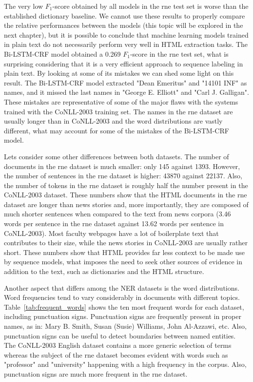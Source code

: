 \documentclass{nle}
\begin{document}
The very low $ F_1 $-score obtained by all models in the \gls{rne} test set is worse than the established
dictionary baseline. We cannot use these results to properly compare the relative performances 
between the models (this topic will be explored in the next chapter), but it is possible to conclude
that machine learning models trained in plain text do not necessarily perform very well in HTML 
extraction tasks. The Bi-LSTM-CRF model obtained a 0.269 $ F_1 $-score in the \gls{rne} test
set, what is surprising considering that it is a very efficient approach to sequence labeling in plain 
text. By looking at some of its mistakes we can shed some light on this result. The Bi-LSTM-CRF model
extracted "Dean Emeritus" and "14101 INF" as names, and it missed the last names in "George E. Elliott"
and "Carl J. Galligan". These mistakes are representative of some of the major flaws with the systems
trained with the CoNLL-2003 training set. The names in the \gls{rne} dataset 
are usually longer than in CoNLL-2003 and the word distributions are vastly different, what may
account for some of the mistakes of the Bi-LSTM-CRF model.

Lets consider some other differences between both datasets. 
The number of documents in the \gls{rne} dataset is much smaller: only 145 against 
1393. However, the number of sentences in the \gls{rne}
dataset is higher: 43870 against 22137. Also, the number of tokens in the \gls{rne} dataset
is roughly half the number present in the {CoNLL-2003} dataset. These numbers show that 
the HTML documents in the \gls{rne} dataset are longer than news 
stories and, more importantly, they are composed of much shorter sentences when compared 
to the text from news corpora (3.46 words per sentence in the \gls{rne} dataset
against 13.62 words per sentence in {CoNLL-2003}). Most faculty webpages have a lot of 
boilerplate text that contributes to their size, while the news stories in {CoNLL-2003}
are usually rather short. These numbers show that HTML provides far less context to be made 
use by sequence models, what imposes the need to seek other sources of evidence in addition to 
the text, such as dictionaries and the HTML structure.

Another aspect that differs among the NER datasets is the word distributions. Word frequencies
tend to vary considerably in documents with different topics. Table~\ref{tab:frequent_words}
shows the ten most frequent words for each dataset, including punctuation signs. Punctuation
signs are frequently present in proper names, as in: Mary B. Smith, Susan (Susie) Williams, John Al-Azzawi, etc.
Also, punctuation signs can be useful to detect boundaries between named entities.
The {CoNLL-2003} English dataset contains a more generic selection of terms whereas the 
subject of the \gls{rne} dataset becomes evident with words such as "professor" and "university" 
happening with a high frequency in the corpus. Also, punctuation signs are much more frequent in
the \gls{rne} dataset. 
\end{document}
